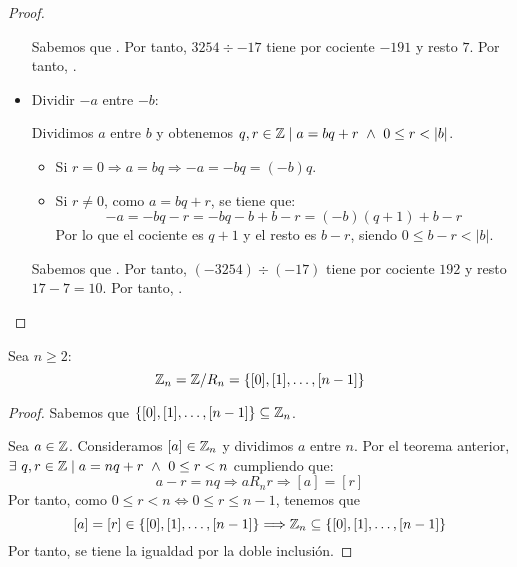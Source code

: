\begin{proof}
\begin{itemize}
        \begin{ejemplo}
            Sabemos que . Por tanto, $3254\div -17$ tiene por cociente $-191$ y resto $7$. Por tanto, .
        \end{ejemplo}

        \item Dividir $-a$ entre $-b$:
        
        Dividimos $a$ entre $b$ y obtenemos $q, r \in \mathbb Z \mid a=bq+r \ \land \  0\leq r < |b|$.
        \begin{itemize}
            \item Si $r=0 \Longrightarrow a=bq \Longrightarrow -a = -bq = (-b)q$.
            \item Si $r\neq 0$, como $a=bq+r$, se tiene que: $$ -a = -bq-r = -bq -b + b - r = (-b)(q+1)+b-r$$            
            Por lo que el cociente es $q+1$ y el resto es $b-r$, siendo $0 \leq b-r < |b|$.
        \end{itemize}

        \begin{ejemplo}
            Sabemos que . Por tanto, $(-3254)\div (-17)$ tiene por cociente $192$ y resto $17-7=10$. Por tanto, .
        \end{ejemplo} 
    \end{itemize}
\end{proof}

\begin{teo}
    Sea $n \geq 2$:
    $$\mathbb Z_n = \mathbb Z/R_n = \{[0], [1], \ldots, [n-1]\}$$
\end{teo}
\begin{proof}
    Sabemos que $\{[0], [1], \ldots, [n-1]\} \subseteq \mathbb Z_n$.
    
    Sea $a\in \mathbb Z$. Consideramos $[a]\in \mathbb Z_n$ y dividimos $a$ entre $n$. Por el teorema anterior, $\exists~q,r \in \mathbb Z \mid a=nq+r \ \land \  0 \leq r < n$ cumpliendo que:
    $$a-r = nq \Longrightarrow aR_nr \Longrightarrow [a]=[r]$$
    Por tanto, como $0\leq r<n  \Longleftrightarrow 0 \leq r \leq n-1$, tenemos que $$[a] = [r] \in \{[0], [1], \ldots, [n-1]\} \Longrightarrow \mathbb Z_n \subseteq \{[0], [1], \ldots, [n-1]\} $$
    Por tanto, se tiene la igualdad por la doble inclusión.
\end{proof}

